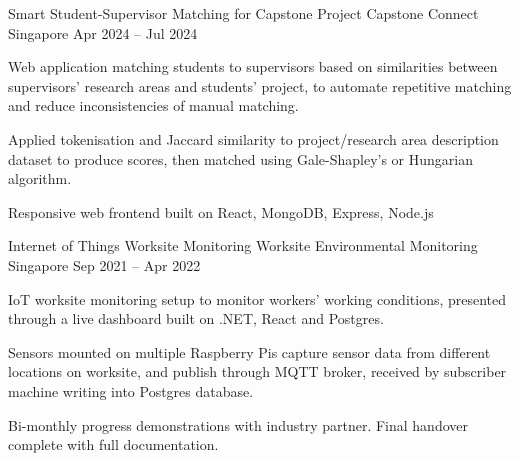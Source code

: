 

\begin{cventries}

    \cventry
    {Smart Student-Supervisor Matching for Capstone Project} %
    {Capstone Connect} %
    {Singapore} %
    {Apr 2024 – Jul 2024} %
    {
        \begin{cvitems} %
            \item {Web application matching students to supervisors based on similarities between supervisors' research areas and students' project, to automate repetitive matching and reduce inconsistencies of manual matching.}
            \item {Applied tokenisation and Jaccard similarity to project/research area description dataset to produce scores, then matched using Gale-Shapley's or Hungarian algorithm.}
            \item {Responsive web frontend built on React, MongoDB, Express, Node.js} \vspace{5mm}
        \end{cvitems}
    }

    \cventry
    {Internet of Things Worksite Monitoring} %
    {Worksite Environmental Monitoring} %
    {Singapore} %
    {Sep 2021 – Apr 2022} %
    {
        \begin{cvitems} %
            \item {IoT worksite monitoring setup to monitor workers' working conditions, presented through a live dashboard built on .NET, React and Postgres.}
            \item {Sensors mounted on multiple Raspberry Pis capture sensor data from different locations on worksite, and publish through MQTT broker, received by subscriber machine writing into Postgres database.}
            \item {Bi-monthly progress demonstrations with industry partner. Final handover complete with full documentation.} \vspace{5mm}
        \end{cvitems}
    }

\end{cventries}
